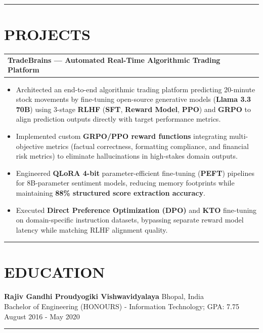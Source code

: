 \documentclass[100pt,a4paper]{article}
\newcommand{\sectionline}{
\begin{center}
\vspace{-10pt}
\rule{1\textwidth}{0.5pt}
\end{center}
\vspace{1pt}
}
\begin{document}
\sectionline
\section*{PROJECTS}
\begin{tabularx}{\textwidth}{@{} X >{\raggedleft\arraybackslash}p{8cm} @{}}
\textbf{TradeBrains — Automated Real-Time Algorithmic Trading Platform}
\end{tabularx}
\begin{itemize}
\vspace{4pt}
\item {Architected an end-to-end algorithmic trading platform predicting 20-minute stock movements by fine-tuning open-source generative models (\textbf{Llama 3.3 70B}) using 3-stage \textbf{RLHF} (\textbf{SFT}, \textbf{Reward Model}, \textbf{PPO}) and \textbf{GRPO} to align prediction outputs directly with target performance metrics.}
\item {Implemented custom \textbf{GRPO/PPO reward functions} integrating multi-objective metrics (factual correctness, formatting compliance, and financial risk metrics) to eliminate hallucinations in high-stakes domain outputs.}
\item {Engineered \textbf{QLoRA 4-bit} parameter-efficient fine-tuning (\textbf{PEFT}) pipelines for 8B-parameter sentiment models, reducing memory footprints while maintaining \textbf{88\% structured score extraction accuracy}.}
\item {Executed \textbf{Direct Preference Optimization (DPO)} and \textbf{KTO} fine-tuning on domain-specific instruction datasets, bypassing separate reward model latency while matching RLHF alignment quality.}
\end{itemize}

\sectionline
\section*{EDUCATION}
\textbf{Rajiv Gandhi Proudyogiki Vishwavidyalaya} \hfill Bhopal, India \\[2pt]
Bachelor of Engineering (HONOURS) - Information Technology; GPA: 7.75 
\hfill August 2016 - May 2020

\sectionline
\end{document}
